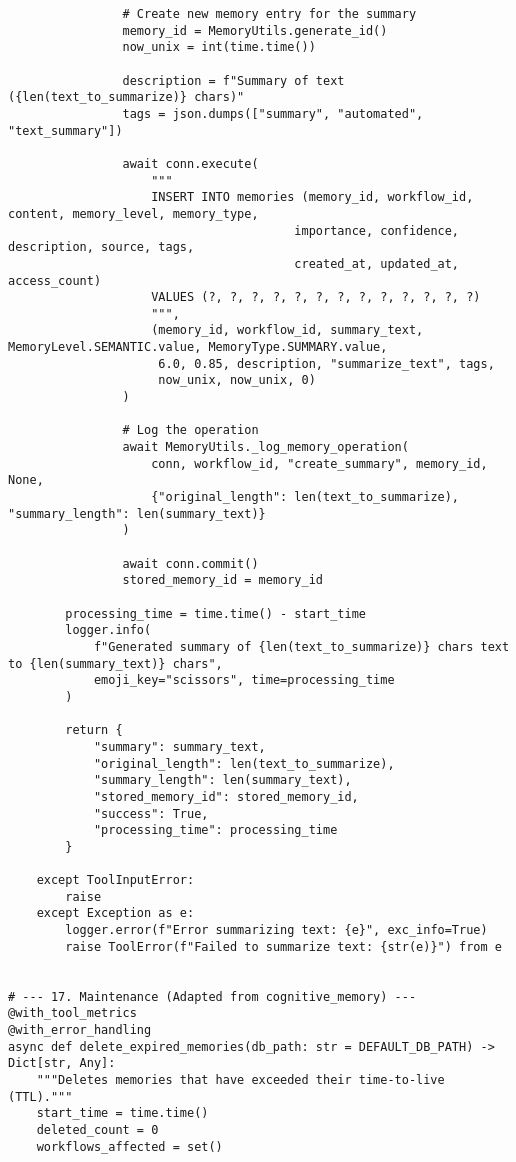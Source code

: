 \documentclass[12pt,a4paper]{article}
\begin{document}
\begin{pageablecode}
\begin{verbatim}
                # Create new memory entry for the summary
                memory_id = MemoryUtils.generate_id()
                now_unix = int(time.time())
                
                description = f"Summary of text ({len(text_to_summarize)} chars)"
                tags = json.dumps(["summary", "automated", "text_summary"])
                
                await conn.execute(
                    """
                    INSERT INTO memories (memory_id, workflow_id, content, memory_level, memory_type, 
                                        importance, confidence, description, source, tags, 
                                        created_at, updated_at, access_count)
                    VALUES (?, ?, ?, ?, ?, ?, ?, ?, ?, ?, ?, ?, ?)
                    """,
                    (memory_id, workflow_id, summary_text, MemoryLevel.SEMANTIC.value, MemoryType.SUMMARY.value,
                     6.0, 0.85, description, "summarize_text", tags,
                     now_unix, now_unix, 0)
                )
                
                # Log the operation
                await MemoryUtils._log_memory_operation(
                    conn, workflow_id, "create_summary", memory_id, None, 
                    {"original_length": len(text_to_summarize), "summary_length": len(summary_text)}
                )
                
                await conn.commit()
                stored_memory_id = memory_id
        
        processing_time = time.time() - start_time
        logger.info(
            f"Generated summary of {len(text_to_summarize)} chars text to {len(summary_text)} chars",
            emoji_key="scissors", time=processing_time
        )
        
        return {
            "summary": summary_text,
            "original_length": len(text_to_summarize),
            "summary_length": len(summary_text),
            "stored_memory_id": stored_memory_id,
            "success": True,
            "processing_time": processing_time
        }
    
    except ToolInputError:
        raise
    except Exception as e:
        logger.error(f"Error summarizing text: {e}", exc_info=True)
        raise ToolError(f"Failed to summarize text: {str(e)}") from e


# --- 17. Maintenance (Adapted from cognitive_memory) ---
@with_tool_metrics
@with_error_handling
async def delete_expired_memories(db_path: str = DEFAULT_DB_PATH) -> Dict[str, Any]:
    """Deletes memories that have exceeded their time-to-live (TTL)."""
    start_time = time.time()
    deleted_count = 0
    workflows_affected = set()


\end{verbatim}
\end{pageablecode}
\end{document}
